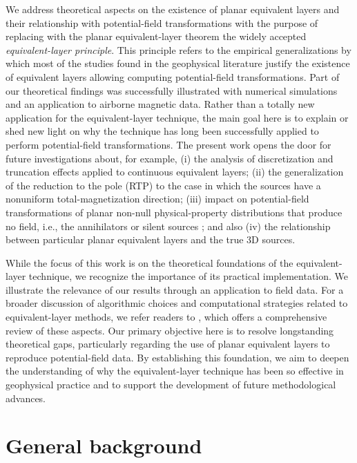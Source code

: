 \documentclass[manuscript,noblind]{geophysics}
\begin{document}
	We address theoretical aspects on the existence of planar equivalent layers and their relationship 
	with potential-field transformations with the purpose of replacing with the planar equivalent-layer theorem
	the widely accepted \textit{equivalent-layer principle}. 
	This principle refers to the 
	empirical generalizations by which most of the studies found in the geophysical literature justify the 
	existence of equivalent layers allowing computing potential-field transformations. 
	Part of our theoretical findings was successfully illustrated with numerical simulations 
	and an application to airborne magnetic data.
	Rather than a totally new application for the equivalent-layer technique, the main goal here is to 
	explain or shed new light on why the technique has long been successfully applied to perform potential-field transformations. 
	The present work opens the door for future investigations about, for example,  
	(i) the analysis of discretization and truncation effects applied to continuous equivalent layers; 
	(ii) the generalization of the reduction to the pole (RTP) 
	to the case in which the sources have a nonuniform total-magnetization direction;
	(iii) impact on potential-field transformations of planar non-null physical-property distributions that produce
	no field, i.e., the annihilators \citep[][ p. 66]{parker1994} or silent sources
	\citep{baratchart2013, baratchart_etal2021}; and also 
	(iv) the relationship between particular planar equivalent layers and the true 3D sources.
	
	While the focus of this work is on the theoretical foundations of the equivalent-layer technique, 
	we recognize the importance of its practical implementation. We illustrate the relevance of our results 
	through an application to field data. For a broader discussion of algorithmic choices and computational 
	strategies related to equivalent-layer methods, we refer readers to \citet{oliveirajr_etal2023}, which 
	offers a comprehensive review of these aspects. Our primary objective here is to resolve longstanding 
	theoretical gaps, particularly regarding the use of planar equivalent layers to reproduce potential-field data. 
	By establishing this foundation, we aim to deepen the understanding of why the equivalent-layer technique has 
	been so effective in geophysical practice and to support the development of future methodological advances.
	
	\section{General background}
	\label{sec:background}
	
\end{document}
